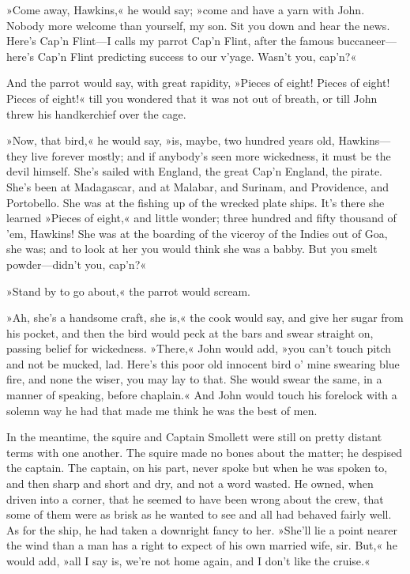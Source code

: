 »Come away, Hawkins,« he would say; »come and have a yarn with John. Nobody more welcome than yourself, my son. Sit you down and hear the news. Here's Cap'n Flint—I calls my parrot Cap'n Flint, after the famous buccaneer—here's Cap'n Flint predicting success to our v'yage. Wasn't you, cap'n?«

And the parrot would say, with great rapidity, »Pieces of eight! Pieces of eight! Pieces of eight!« till you wondered that it was not out of breath, or till John threw his handkerchief over the cage.

»Now, that bird,« he would say, »is, maybe, two hundred years old, Hawkins—they live forever mostly; and if anybody's seen more wickedness, it must be the devil himself. She's sailed with England, the great Cap'n England, the pirate. She's been at Madagascar, and at Malabar, and Surinam, and Providence, and Portobello. She was at the fishing up of the wrecked plate ships. It's there she learned »Pieces of eight,« and little wonder; three hundred and fifty thousand of 'em, Hawkins! She was at the boarding of the viceroy of the Indies out of Goa, she was; and to look at her you would think she was a babby. But you smelt powder—didn't you, cap'n?«

»Stand by to go about,« the parrot would scream.

»Ah, she's a handsome craft, she is,« the cook would say, and give her sugar from his pocket, and then the bird would peck at the bars and swear straight on, passing belief for wickedness. »There,« John would add, »you can't touch pitch and not be mucked, lad. Here's this poor old innocent bird o' mine swearing blue fire, and none the wiser, you may lay to that. She would swear the same, in a manner of speaking, before chaplain.« And John would touch his forelock with a solemn way he had that made me think he was the best of men.

In the meantime, the squire and Captain Smollett were still on pretty distant terms with one another. The squire made no bones about the matter; he despised the captain. The captain, on his part, never spoke but when he was spoken to, and then sharp and short and dry, and not a word wasted. He owned, when driven into a corner, that he seemed to have been wrong about the crew, that some of them were as brisk as he wanted to see and all had behaved fairly well. As for the ship, he had taken a downright fancy to her. »She'll lie a point nearer the wind than a man has a right to expect of his own married wife, sir. But,« he would add, »all I say is, we're not home again, and I don't like the cruise.«

